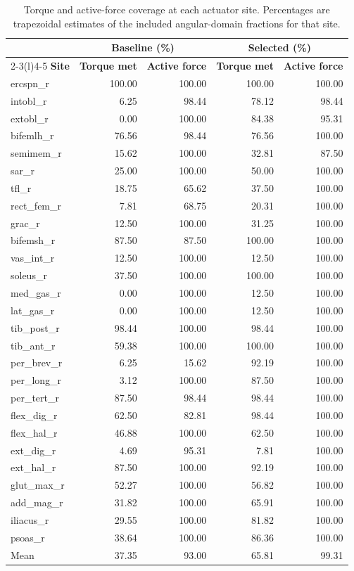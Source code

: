 \begin{table}[p]
\centering\small
\caption{Torque and active-force coverage at each actuator site. Percentages are trapezoidal estimates of the included angular-domain fractions for that site.}
\label{tab:capability_by_site}
\begin{tabular}{@{}lrrrr@{}}
\toprule
& \multicolumn{2}{c}{Baseline (\%)} & \multicolumn{2}{c}{Selected (\%)} \\
\cmidrule(lr){2-3}\cmidrule(l){4-5}
\textbf{Site} & \textbf{Torque met} & \textbf{Active force} & \textbf{Torque met} & \textbf{Active force} \\
\midrule
ercspn\_r & 100.00 & 100.00 & 100.00 & 100.00 \\
intobl\_r & 6.25 & 98.44 & 78.12 & 98.44 \\
extobl\_r & 0.00 & 100.00 & 84.38 & 95.31 \\
bifemlh\_r & 76.56 & 98.44 & 76.56 & 100.00 \\
semimem\_r & 15.62 & 100.00 & 32.81 & 87.50 \\
sar\_r & 25.00 & 100.00 & 50.00 & 100.00 \\
tfl\_r & 18.75 & 65.62 & 37.50 & 100.00 \\
rect\_fem\_r & 7.81 & 68.75 & 20.31 & 100.00 \\
grac\_r & 12.50 & 100.00 & 31.25 & 100.00 \\
bifemsh\_r & 87.50 & 87.50 & 100.00 & 100.00 \\
vas\_int\_r & 12.50 & 100.00 & 12.50 & 100.00 \\
soleus\_r & 37.50 & 100.00 & 100.00 & 100.00 \\
med\_gas\_r & 0.00 & 100.00 & 12.50 & 100.00 \\
lat\_gas\_r & 0.00 & 100.00 & 12.50 & 100.00 \\
tib\_post\_r & 98.44 & 100.00 & 98.44 & 100.00 \\
tib\_ant\_r & 59.38 & 100.00 & 100.00 & 100.00 \\
per\_brev\_r & 6.25 & 15.62 & 92.19 & 100.00 \\
per\_long\_r & 3.12 & 100.00 & 87.50 & 100.00 \\
per\_tert\_r & 87.50 & 98.44 & 98.44 & 100.00 \\
flex\_dig\_r & 62.50 & 82.81 & 98.44 & 100.00 \\
flex\_hal\_r & 46.88 & 100.00 & 62.50 & 100.00 \\
ext\_dig\_r & 4.69 & 95.31 & 7.81 & 100.00 \\
ext\_hal\_r & 87.50 & 100.00 & 92.19 & 100.00 \\
glut\_max\_r & 52.27 & 100.00 & 56.82 & 100.00 \\
add\_mag\_r & 31.82 & 100.00 & 65.91 & 100.00 \\
iliacus\_r & 29.55 & 100.00 & 81.82 & 100.00 \\
psoas\_r & 38.64 & 100.00 & 86.36 & 100.00 \\
\midrule
Mean & 37.35 & 93.00 & 65.81 & 99.31 \\
\bottomrule
\end{tabular}
\end{table}
